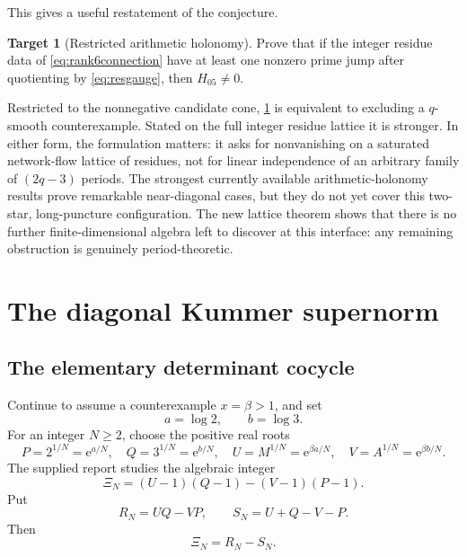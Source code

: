 \documentclass[11pt]{article}
\theoremstyle{definition}
\newtheorem{target}[theorem]{Target}
\theoremstyle{remark}
\newcommand{\e}{\mathrm e}
\begin{document}
This gives a useful restatement of the conjecture.

\begin{target}[Restricted arithmetic holonomy]\label{target:holonomy}
Prove that if the integer residue data of \eqref{eq:rank6connection} have at least
one nonzero prime jump after quotienting by \eqref{eq:resgauge}, then
$H_{05}\ne0$.
\end{target}

Restricted to the nonnegative candidate cone, \cref{target:holonomy} is
equivalent to excluding a $q$-smooth counterexample.  Stated on the full
integer residue lattice it is stronger.  In either form, the formulation matters:
it asks for nonvanishing on a saturated network-flow lattice of residues, not for
linear independence of an arbitrary family of $(2q-3)$ periods.  The strongest currently available
arithmetic-holonomy results prove remarkable near-diagonal cases, but they do
not yet cover this two-star, long-puncture configuration.  The new lattice theorem
shows that there is no further finite-dimensional algebra left to discover at
this interface: any remaining obstruction is genuinely period-theoretic.

\section{The diagonal Kummer supernorm}

\subsection{The elementary determinant cocycle}

Continue to assume a counterexample $x=\beta>1$, and set
\begin{equation}\label{eq:ab}
 a=\log2,\qquad b=\log3.
\end{equation}
For an integer $N\ge2$, choose the positive real roots
\begin{equation}\label{eq:roots}
 P=2^{1/N}=\e^{a/N},\quad
 Q=3^{1/N}=\e^{b/N},\quad
 U=M^{1/N}=\e^{\beta a/N},\quad
 V=A^{1/N}=\e^{\beta b/N}.
\end{equation}
The supplied report studies the algebraic integer
\begin{equation}\label{eq:Xi}
 \Xi_N=(U-1)(Q-1)-(V-1)(P-1).
\end{equation}
Put
\begin{equation}\label{eq:RS}
 R_N=UQ-VP,
 \qquad
 S_N=U+Q-V-P.
\end{equation}
Then
\begin{equation}\label{eq:XiRS}
 \Xi_N=R_N-S_N.
\end{equation}
\end{document}
